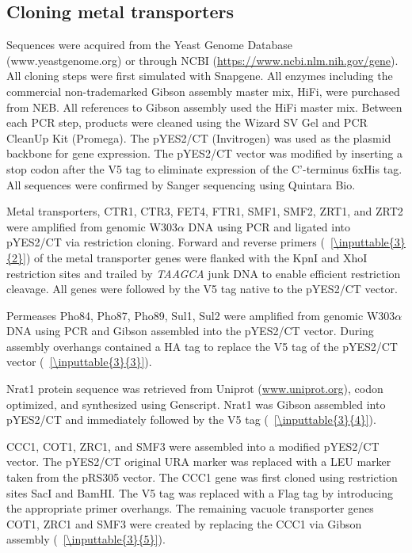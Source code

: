 \documentclass[../main/main]{subfiles}
\begin{document}
\subsection*{Cloning metal transporters}
Sequences were acquired from the Yeast Genome Database (www.yeastgenome.org) or through NCBI (\url{https://www.ncbi.nlm.nih.gov/gene}). All cloning steps were first simulated with Snapgene. All enzymes including the commercial non-trademarked Gibson assembly master mix, HiFi, were purchased from NEB. All references to Gibson assembly used the HiFi master mix. Between each PCR step, products were cleaned using the Wizard SV Gel and PCR CleanUp Kit (Promega). The pYES2/CT (Invitrogen) was used as the plasmid backbone for gene expression. The pYES2/CT vector was modified by inserting a stop codon after the V5 tag to eliminate expression of the C'-terminus 6xHis tag. All sequences were confirmed by Sanger sequencing using Quintara Bio.

Metal transporters, CTR1, CTR3, FET4, FTR1, SMF1, SMF2, ZRT1, and ZRT2 were amplified from genomic W303$\alpha$ DNA using PCR and ligated into pYES2/CT via restriction cloning. Forward and reverse primers (\sTABLE~\ref{\inputtable{3}{2}}) of the metal transporter genes were flanked with the KpnI and XhoI restriction sites and trailed by \textit{TAAGCA} junk DNA to enable efficient restriction cleavage. All genes were followed by the V5 tag native to the pYES2/CT vector.

Permeases Pho84, Pho87, Pho89, Sul1, Sul2 were amplified from genomic W303$\alpha$ DNA using PCR and Gibson assembled into the pYES2/CT vector. During assembly overhangs contained a HA tag to replace the V5 tag of the pYES2/CT vector (\sTABLE~\ref{\inputtable{3}{3}}).

Nrat1 protein sequence was retrieved from Uniprot (\url{www.uniprot.org}), codon optimized, and synthesized using Genscript. Nrat1 was Gibson assembled into pYES2/CT and immediately followed by the V5 tag (\sTABLE~\ref{\inputtable{3}{4}}).

CCC1, COT1, ZRC1, and SMF3 were assembled into a modified pYES2/CT vector. The pYES2/CT original URA marker was replaced with a LEU marker taken from the pRS305 vector. The CCC1 gene was first cloned using restriction sites SacI and BamHI. The V5 tag was replaced with a Flag tag by introducing the appropriate primer overhangs. The remaining vacuole transporter genes COT1, ZRC1 and SMF3 were created by replacing the CCC1 via Gibson assembly (\sTABLE~\ref{\inputtable{3}{5}}).
\end{document}

